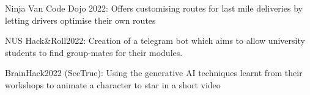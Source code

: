 

\begin{cvskills}
    \cvskill
    {Ninja Van Code Dojo 2022:} %
    {Offers customising routes for last mile deliveries by letting drivers optimise their own routes} %

    \cvskill
    {NUS Hack\&Roll2022:} %
    {Creation of a telegram bot which aims to allow university students to find group-mates for their modules.} %
    
    \cvskill
    {BrainHack2022 (SeeTrue):} %
    {Using the generative AI techniques learnt from their workshops to animate a character to star in a short video} %

\end{cvskills}
